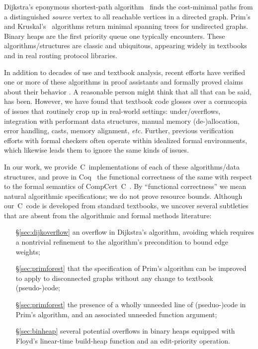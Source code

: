 Dijkstra's eponymous shortest-path algorithm~\cite{DBLP:journals/nm/Dijkstra59} finds
the cost-minimal paths from a distinguished \emph{source} vertex
to all reachable vertices in a directed graph. Prim's~\cite{prim2:prim} and Kruskal's~\cite{kruskal} algorithms return minimal spanning trees for undirected graphs.  Binary heaps are the first priority queue one typically encounters.
These algorithms/structures are classic and ubiquitous, appearing widely in textbooks~\cite{clrs,DBLP:books/daglib/0022194,heineman2008algorithms,rozen,kepnergilbert,sedgewick} and in real routing protocol libraries.

In addition to decades of use and textbook analysis, recent efforts have verified one or more of these algorithms in proof
assistants and formally proved claims about their behavior \cite{chen2003dijkstra,Moore2005,arthur,DBLP:journals/afp/LammichN19,DBLP:conf/ictac/Guttmann16}.  A reasonable person might think that all
that can be said, has been.  However, we have found that
textbook code glosses over a cornucopia
of issues that routinely crop up in real-world settings: under/overflows, integration with performant data structures, manual memory (de-)allocation,
error handling, casts, memory alignment, \emph{etc.} Further, previous verification efforts with formal checkers often operate
within idealized formal environments, which likewise leads them to ignore the same kinds of issues.

In our work, we provide~C~implementations of each of these algorithms/data structures, and prove in Coq~\cite{Coq} the functional correctness of the same with respect to the formal semantics of CompCert~C~\cite{leroy:compcert}.  By ``functional correctness'' we mean natural algorithmic specifications; we do not prove resource bounds.  Although our~C~code is developed from standard textbooks, we uncover several subtleties
that are absent from the algorithmic and formal methods literature:
\vspace*{-0.25em}
\begin{itemize}
\item[\S\ref{sec:dijkoverflow}] an overflow in Dijkstra's algorithm, avoiding which requires a nontrivial refinement to the algorithm's precondition to bound edge weights;
\item[\S\ref{sec:primforest}] that the specification of Prim's algorithm can be improved to apply to disconnected graphs without any change to textbook (pseudo-)code;
\item[\S\ref{sec:primforest}] the presence of a wholly unneeded line of (pseduo-)code in Prim's algorithm, and an associated unneeded function argument;
\item[\S\ref{sec:binheap}] several potential overflows in binary heaps equipped with Floyd's linear-time build-heap function and an edit-priority operation.
\end{itemize}
\vspace*{-0.25em}

